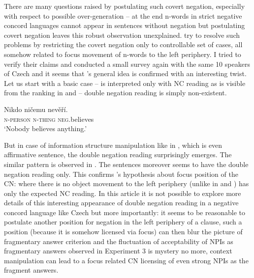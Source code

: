 \documentclass[output=paper,
]{langscibook}
\begin{document}
\noindent There are many questions raised by postulating such covert negation, especially with respect to possible over-generation -- at the end n-words in strict negative concord languages cannot appear in sentences without negation but postulating covert negation leaves this robust observation unexplained. \cite{fualuaus2016fragment} try to resolve such problems by restricting the covert negation only to controllable set of cases, all somehow related to focus movement of n-words to the left periphery. I tried to verify their claims and conducted a small survey again with the same 10 speakers of Czech and it seems that \citeauthor{fualuaus2016fragment}'s general idea is confirmed with an interesting twist. Let us start with a basic case --  is interpreted only with NC reading as is visible from the ranking in  and  -- double negation reading is simply non-existent.

\ea\label{ex-38} \gll Nikdo ničemu nevěří.\\
\textsc{n-person} \textsc{n-thing} \textsc{neg}.believes\\
\glt `Nobody believes anything.'
\z
\z

\noindent But in case of information structure manipulation like in , which is even affirmative sentence, the double negation reading surprisingly emerges. The similar pattern is observed in . The sentences moreover seems to have the double negation reading only. This confirms \citeauthor{fualuaus2016fragment}'s hypothesis about focus position of the CN:  where there is no object movement to the left periphery (unlike in  and ) has only the expected NC reading. In this article it is not possible to explore more details of this interesting appearance of double negation reading in a negative concord language like Czech but more importantly: it seems to be reasonable to postulate another position for negation in the left periphery of a clause, such a position (because it is somehow licensed via focus) can then blur the picture of fragmentary answer criterion and the fluctuation of acceptability of NPIs as fragmentary answers observed in Experiment 3 is mystery no more, context manipulation can lead to a focus related CN licensing of even strong NPIs as the fragment answers.
\end{document}
